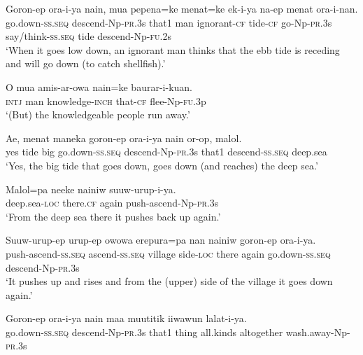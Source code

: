 \ea\label{ex:a:x4}
\gll  Goron-ep  ora-i-ya  nain,  mua  pepena=ke  menat=ke           ek-i-ya  na-ep  menat  ora-i-nan. \\
go.down-\textsc{ss.seq}  descend-Np-\textsc{pr}.3s  that1  man  ignorant-\textsc{cf}  tide-\textsc{cf}  go-Np-\textsc{pr}.3s  say/think-\textsc{ss.seq}  tide  descend-Np-\textsc{fu}.2s \\


\glt ‘When it goes low down, an ignorant man thinks that the ebb tide is receding and will go down (to catch shellfish).’ \\
\z


\ea\label{ex:a:x5}
\gll  O  mua  amis-ar-owa  nain=ke  baurar-i-kuan. \\
\textsc{intj}  man  knowledge-\textsc{inch}  that-\textsc{cf}  flee-Np-\textsc{fu}.3p \\
\glt ‘(But) the knowledgeable people run away.’ \\
\z


\ea\label{ex:a:x6}
\gll  Ae,  menat  maneka  goron-ep  ora-i-ya  nain  or-op,                malol. \\
yes  tide  big  go.down-\textsc{ss.seq}  descend-Np-\textsc{pr}.3s  that1  descend-\textsc{ss.seq}   deep.sea \\


\glt ‘Yes, the big tide that goes down, goes down (and reaches) the deep sea.’ \\
\z


\ea\label{ex:a:x7}
\gll  Malol=pa  neeke  nainiw  suuw-urup-i-ya. \\
deep.sea-\textsc{loc}  there.\textsc{cf}  again  push-ascend-Np-\textsc{pr}.3s \\
\glt ‘From the deep sea there it pushes back up again.’ \\
\z


\ea\label{ex:a:x8}
\gll  Suuw-urup-ep  urup-ep  owowa  erepura=pa  nan  nainiw         goron-ep  ora-i-ya. \\
push-ascend-\textsc{ss.seq}  ascend-\textsc{ss.seq}  village  side-\textsc{loc}  there  again  go.down-\textsc{ss.seq}  descend-Np-\textsc{pr}.3s \\


\glt ‘It pushes up and rises and from the (upper) side of the village it goes down again.’ \\
\z


\ea\label{ex:a:x9}
\gll  Goron-ep  ora-i-ya  nain  maa  muutitik  iiwawun                 lalat-i-ya. \\
go.down-\textsc{ss.seq}  descend-Np-\textsc{pr}.3s  that1  thing  all.kinds  altogether  wash.away-Np-\textsc{pr}.3s \\


